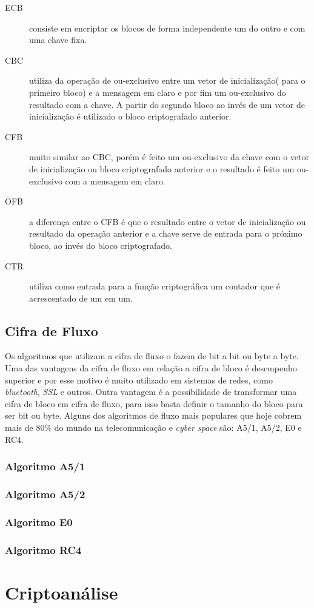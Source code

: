 \begin{description}
\item [ECB]consiste em encriptar os blocos de forma independente um do outro e com uma chave fixa.
\item[CBC] utiliza da operação de ou-exclusivo entre um vetor de inicialização( para o primeiro bloco) e a mensagem em claro e por fim um ou-exclusivo do resultado com a chave. A partir do segundo bloco ao invés de um vetor de inicialização é utilizado o bloco criptografado anterior.
\item[CFB] muito similar ao CBC, porém é feito um ou-exclusivo da chave com o vetor de inicialização ou bloco criptografado anterior e o resultado é feito um ou-exclusivo com a mensagem em claro.
\item[OFB] a diferença entre o CFB é que o resultado entre o vetor de inicialização ou resultado da operação anterior e a chave serve de entrada para o próximo bloco, ao invés do bloco criptografado.
\item[CTR] utiliza como entrada para a função criptográfica um contador que é acrescentado de um em um. 
\end{description}

\subsection{Cifra de Fluxo}
\label{stream-cipher}

Os algoritmos que utilizam a cifra de fluxo o fazem de bit a bit ou byte a byte. Uma das vantagens da cifra de fluxo em relação a cifra de bloco é desempenho superior e por esse motivo é muito utilizado em sistemas de redes, como \textit{bluetooth}, \textit{SSL} e outros. Outra vantagem é a possibilidade de transformar uma cifra de bloco em cifra de fluxo, para isso basta definir o tamanho do bloco para ser bit ou byte. Alguns dos algoritmos de fluxo mais populares que hoje cobrem mais de 80$\%$ do mundo na telecomunicação e \textit{cyber space} são: A5/1, A5/2, E0 e RC4. ~\cite{pegar-citação}


\subsubsection{Algoritmo A5/1}
\label{algorithm-a51}

\subsubsection{Algoritmo A5/2}
\label{algorithm-a52}

\subsubsection{Algoritmo E0}
\label{algorithm-e0}

\subsubsection{Algoritmo RC4}
\label{algorithm-rc4}

\section{Criptoanálise}